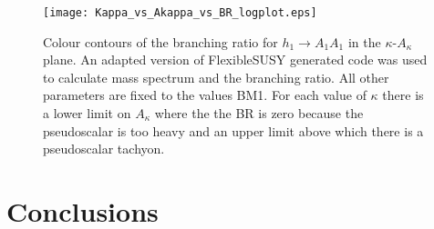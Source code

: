 \documentclass[12pt,a4paper]{article}
\begin{document}

\begin{figure}[h!]
\begin{center}
\texttt{[image: Kappa\_vs\_Akappa\_vs\_BR\_logplot.eps]}
\caption{Colour contours of the branching ratio for $h_1\rightarrow
  A_1 A_1$ in the $\kappa$-$A_\kappa$ plane. An adapted version of
  FlexibleSUSY generated code was used to calculate mass spectrum and
  the branching ratio.  All other parameters are fixed to the values
  BM1.  For each value of $\kappa$ there is a lower limit on
  $A_\kappa$ where the the BR is zero because the pseudoscalar is too
  heavy and an upper limit above which there is a pseudoscalar
  tachyon.  }
\end{center}
\end{figure}



\section{Conclusions}
\end{document}
